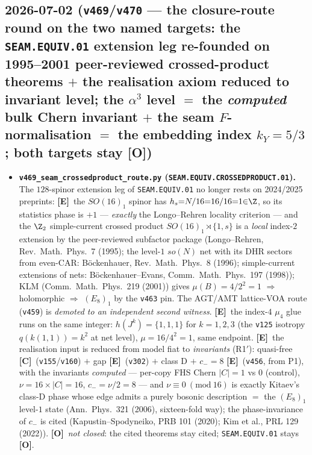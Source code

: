 \documentclass[11pt]{article}
\providecommand{\mE}{\textbf{[E]}}\providecommand{\mC}{\textbf{[C]}}
\providecommand{\mO}{\textbf{[O]}}\providecommand{\mX}{\textbf{[X]}}
\begin{document}
\subsection*{2026-07-02 (\texttt{v469}/\texttt{v470} --- the closure-route round on the two named targets: the \texttt{SEAM.EQUIV.01} extension leg re-founded on 1995--2001 peer-reviewed crossed-product theorems $+$ the realisation axiom reduced to invariant level; the $\alpha^3$ level $=$ the \emph{computed} bulk Chern invariant $+$ the seam $F$-normalisation $=$ the embedding index $k_Y{=}5/3$; both targets stay \mO)}
\begin{itemize}
\item \textbf{\texttt{v469\_seam\_crossedproduct\_route.py} (\texttt{SEAM.EQUIV.CROSSEDPRODUCT.01}).}
The $128$-spinor extension leg of \texttt{SEAM.EQUIV.01} no longer rests on 2024/2025 preprints:
\mE\ the $SO(16)_1$ spinor has $h_s{=}N/16{=}16/16{=}1{\in}\Z$, so its statistics phase is $+1$ ---
\emph{exactly} the Longo--Rehren locality criterion --- and the $\Z_2$ simple-current crossed product
$SO(16)_1{\rtimes}\{1,s\}$ is a \emph{local} index-$2$ extension by the peer-reviewed subfactor package
(Longo--Rehren, Rev.\ Math.\ Phys.\ 7 (1995); the level-$1$ $so(N)$ net with its DHR sectors from
even-CAR: B\"ockenhauer, Rev.\ Math.\ Phys.\ 8 (1996); simple-current extensions of nets:
B\"ockenhauer--Evans, Comm.\ Math.\ Phys.\ 197 (1998)); KLM (Comm.\ Math.\ Phys.\ 219 (2001)) gives
$\mu(B){=}4/2^2{=}1$ $\Rightarrow$ holomorphic $\Rightarrow$ $(E_8)_1$ by the \texttt{v463} pin.
The AGT/AMT lattice-VOA route (\texttt{v459}) is \emph{demoted to an independent second witness}.
\mE\ the index-$4$ $\mu_4$ glue runs on the same integer: $h(J^k){=}\{1,1,1\}$ for $k{=}1,2,3$
(the \texttt{v125} isotropy $q(k(1,1)){=}k^2$ at net level), $\mu{=}16/4^2{=}1$, same endpoint.
\mE\ the realisation input is reduced from model fiat to \emph{invariants} (R1$'$): quasi-free
\mC\ (\texttt{v155}/\texttt{v160}) $+$ gap \mE\ (\texttt{v302}) $+$ class D $+$ $c_-{=}8$ \mE\
(\texttt{v456}, from P1), with the invariants \emph{computed} --- per-copy FHS Chern $|C|{=}1$ vs $0$
(control), $\nu{=}16{\times}|C|{=}16$, $c_-{=}\nu/2{=}8$ --- and $\nu\equiv 0\ (\mathrm{mod}\ 16)$ is
exactly Kitaev's class-D phase whose edge admits a purely bosonic description $=$ the $(E_8)_1$
level-$1$ state (Ann.\ Phys.\ 321 (2006), sixteen-fold way); the phase-invariance of $c_-$ is cited
(Kapustin--Spodyneiko, PRB 101 (2020); Kim et al., PRL 129 (2022)). \mO\ \emph{not closed}: the cited
theorems stay cited; \texttt{SEAM.EQUIV.01} stays \mO.

\end{itemize}
\end{document}
